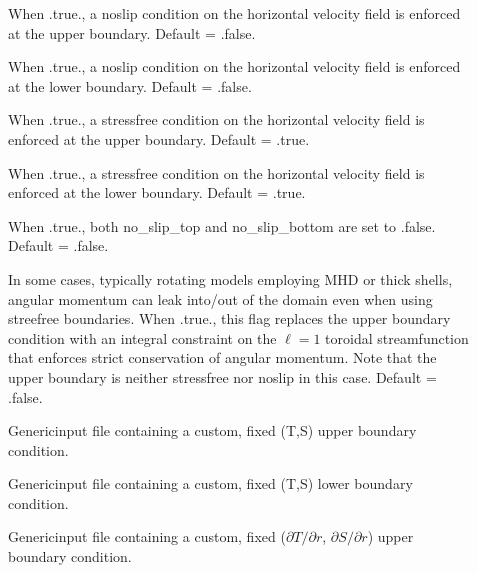 \documentclass[letterpaper,11pt,english]{sphinxmanual}
\begin{document}
\begin{description}
\item[{}] \leavevmode
\sphinxAtStartPar
When .true., a no\sphinxhyphen{}slip condition on the horizontal velocity field is enforced at the upper boundary.  Default = .false.

\item[{}] \leavevmode
\sphinxAtStartPar
When .true., a no\sphinxhyphen{}slip condition on the horizontal velocity field is enforced at the lower boundary.  Default = .false.

\item[{}] \leavevmode
\sphinxAtStartPar
When .true., a stress\sphinxhyphen{}free condition on the horizontal velocity field is enforced at the upper boundary.  Default = .true.

\item[{}] \leavevmode
\sphinxAtStartPar
When .true., a stress\sphinxhyphen{}free condition on the horizontal velocity field is enforced at the lower boundary.  Default = .true.

\item[{}] \leavevmode
\sphinxAtStartPar
When .true., both no\_slip\_top and no\_slip\_bottom are set to .false.  Default = .false.

\item[{}] \leavevmode
\sphinxAtStartPar
In some cases, typically rotating models employing MHD or thick shells, angular momentum can leak into/out of the domain even when using stree\sphinxhyphen{}free boundaries.  When .true., this flag replaces the upper boundary condition with an integral constraint on the \(\ell=1\) toroidal streamfunction that enforces strict conservation of angular momentum.  Note that the upper boundary is neither stress\sphinxhyphen{}free nor no\sphinxhyphen{}slip in this case.  Default = .false.

\item[{}] \leavevmode
\sphinxAtStartPar
Generic\sphinxhyphen{}input file containing a custom, fixed (T,S) upper boundary condition.

\item[{}] \leavevmode
\sphinxAtStartPar
Generic\sphinxhyphen{}input file containing a custom, fixed (T,S) lower boundary condition.

\item[{}] \leavevmode
\sphinxAtStartPar
Generic\sphinxhyphen{}input file containing a custom, fixed (\(\partial T/\partial r\), \(\partial S/\partial r\)) upper boundary condition.


\end{description}
\end{document}
